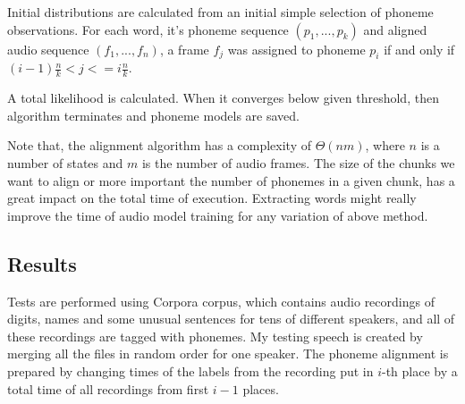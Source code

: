 \documentclass[12pt,a4paper,english]{article}
\begin{document}
Initial distributions are calculated from an initial simple selection of phoneme observations. For each word, it's phoneme sequence $(p_1, ..., p_k)$ and aligned audio sequence $(f_1, ..., f_n)$, a frame $f_j$ was assigned to phoneme $p_i$ if and only if $ (i - 1) \frac n k < j <= i \frac n k$.\newline

A total likelihood is calculated. When it converges below given threshold, then algorithm terminates and phoneme models are saved. \newline

Note that, the alignment algorithm has a complexity of $\Theta(nm)$, where $n$ is a number of states and $m$ is the number of audio frames. The size of the chunks we want to align or more important the number of phonemes in a given chunk, has a great impact on the total time of execution. Extracting words might really improve the time of audio model training for any variation of above method.

\newpage
\subsection{Results}

Tests are performed using Corpora corpus, which contains audio recordings of digits, names and some unusual sentences for tens of different speakers, and all of these recordings are tagged with phonemes. \newline
My testing speech is created by merging all the files in random order for one speaker. The phoneme alignment is prepared by changing times of the labels from the recording put in $i$-th place by a total time of all recordings from first $i-1$ places. \newline
\end{document}
